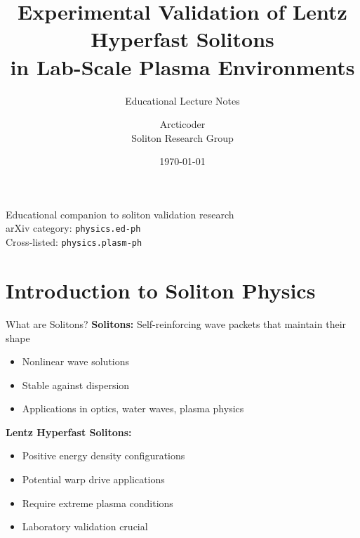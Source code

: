 \documentclass[aspectratio=169,xcolor={table,dvipsnames}]{beamer}
\title[Soliton Validation]{Experimental Validation of Lentz Hyperfast Solitons\\in Lab-Scale Plasma Environments}
\subtitle{Educational Lecture Notes}
\author[Arcticoder]{Arcticoder\\Soliton Research Group}
\institute[Lab]{Advanced Physics Laboratory}
\date{\today}
\begin{document}
\begin{frame}
    \titlepage
    \begin{center}
        \small
        Educational companion to soliton validation research\\
        \vspace{0.3cm}
        arXiv category: \texttt{physics.ed-ph}\\
        Cross-listed: \texttt{physics.plasm-ph}
    \end{center}
\end{frame}

\section{Introduction to Soliton Physics}

\begin{frame}{What are Solitons?}
    \textbf{Solitons:} Self-reinforcing wave packets that maintain their shape
    \begin{itemize}
        \item Nonlinear wave solutions
        \item Stable against dispersion
        \item Applications in optics, water waves, plasma physics
    \end{itemize}
    
    \vspace{0.5cm}
    \textbf{Lentz Hyperfast Solitons:}
    \begin{itemize}
        \item Positive energy density configurations
        \item Potential warp drive applications
        \item Require extreme plasma conditions
        \item Laboratory validation crucial
    \end{itemize}
\end{frame}
\end{document}
